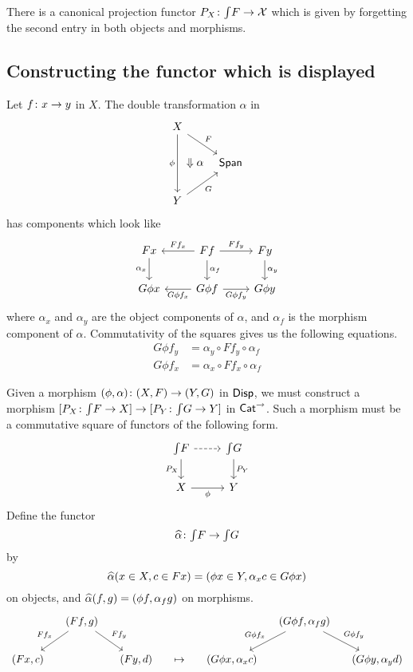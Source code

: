 There is a canonical projection functor $P_X \colon \textstyle{\int} F \to \mathcal{X}$ which is given by forgetting the second entry in both objects and morphisms.

\subsection*{Constructing the functor which is displayed}

Let $f \colon x \to y$ in $X$. The double transformation $\alpha$ in
\[
\begin{tikzcd}
    X
    \arrow[dr, "F"]
    \arrow[dd, swap, "\phi"]
    \arrow[dd, phantom, "\Downarrow \alpha", bend left = 40]
    \\&
    \Span
    \\
    Y
    \arrow[ur, swap, "G"]
\end{tikzcd}\]
has components which look like
\[
\begin{tikzcd}
    Fx
    \arrow[d, "\alpha_x", swap]
    &
    Ff
    \arrow[d, "\alpha_f"]
    \arrow[r, "Ff_y"]
    \arrow[l, "Ff_x", swap]
    &
    Fy
    \arrow[d, "\alpha_y"]
    \\
    G \phi x
    &
    G \phi f
    \arrow[r, "G\phi f_y", swap]
    \arrow[l, "G\phi f_x"]
    &
    G \phi y
\end{tikzcd}
\]
where $\alpha_x$ and $\alpha_y$ are the object components of $\alpha$, and $\alpha_f$ is the morphism component of $\alpha$. Commutativity of the squares gives us the following equations.
\begin{align*}
    G\phi f_y &= \alpha_y \circ Ff_y \circ \alpha_f 
    \\
    G\phi f_x &= \alpha_x \circ Ff_x \circ \alpha_f 
\end{align*}

Given a morphism $(\phi, \alpha) \colon (X, F) \to (Y, G)$ in $\mathsf{Disp}$, we must construct a morphism $[P_X \colon \textstyle{\int} F \to X] \to [P_Y \colon \textstyle{\int} G \to Y]$ in $\mathsf{Cat}^\to$. Such a morphism must be a commutative square of functors of the following form. 
\[
\begin{tikzcd}
    \Int F
    \arrow[d, "P_X", swap]
    \arrow[r, dashed]
    &
    \Int G
    \arrow[d, "P_Y"]
    \\
    X 
    \arrow[r, swap, "\phi"]
    &
    Y
\end{tikzcd}
\] 
Define the functor \[\widehat \alpha \colon \textstyle{\int} F \to \textstyle{\int} G\] 
by 
\[
    \widehat \alpha(x \in X, c \in F x) = (\phi x \in Y, \alpha_x c \in G \phi x)
\]
on objects, and $\widehat \alpha(f, g) = (\phi f, \alpha_f g)$ on morphisms.
\[
\begin{tikzcd}[column sep = small]
    &
    (Ff, g)
    \arrow[dl, swap, "Ff_x"]
    \arrow[dr, "Ff_y"]
    &&&&
    (G \phi f, \alpha_f g)
    \arrow[dl, swap, "G \phi f_x"]
    \arrow[dr, "G \phi f_y"]
    \\
    (Fx, c)
    &&
    (Fy, d)
    &
    \mapsto
    &
    (G \phi x, \alpha_x c)
    &&
    (G \phi y, \alpha_y d)
\end{tikzcd}\]

